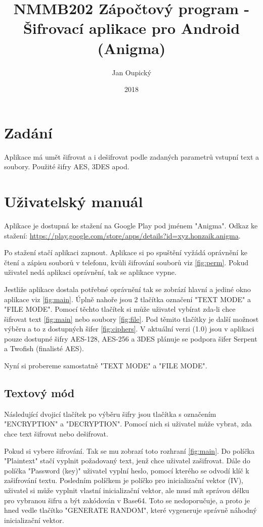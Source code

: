 \documentclass[12pt, a4paper]{article}
\title{NMMB202 Zápočtový program - Šifrovací aplikace pro Android (Anigma)}
\author{Jan Oupický}
\date{2018}
\begin{document}
\maketitle

\section{Zadání}

Aplikace má umět šifrovat a i dešifrovat podle zadaných parametrů vstupní text a soubory. Použité šifry AES, 3DES apod.

\section{Uživatelský manuál}

Aplikace je dostupná ke stažení na Google Play pod jménem "Anigma". Odkaz ke stažení: \url{https://play.google.com/store/apps/details?id=xyz.honzaik.anigma}.

Po stažení stačí aplikaci zapnout. Aplikace si po spuštění vyžádá oprávnění ke čtení a zápisu souborů v telefonu, kvůli šifrování souborů viz \ref{fig:perm}. Pokud uživatel nedá aplikaci oprávnění, tak se aplikace vypne.

Jestliže aplikace dostala potřebné oprávnění tak se zobrází hlavní a jediné okno aplikace viz \ref{fig:main}. Úplně nahoře jsou 2 tlačítka označení "TEXT MODE" a "FILE MODE". Pomocí těchto tlačítek si může uživatel vybírat zda-li chce šifrovat text \ref{fig:main} nebo soubory \ref{fig:file}. Pod těmito tlačítky je další možnost výběru a to z dostupných šifer \ref{fig:ciphers}. V aktuální verzi (1.0) jsou v aplikaci pouze dostupné šifry AES-128, AES-256 a 3DES plánuje se podpora šifer Serpent a Twofish (finalisté AES).

Nyní si probereme samostatně "TEXT MODE" a "FILE MODE".

\subsection{Textový mód}
Následující dvojicí tlačítek po výběru šifry jsou tlačítka s označením "ENCRYPTION" a "DECRYPTION". Pomocí nich si uživatel může vybrat, zda chce text šifrovat nebo dešifrovat. 

Pokud si vybere šifrování. Tak se mu zobrazí toto rozhraní \ref{fig:main}. Do políčka "Plaintext" stačí vyplnit požadovaný text, jenž chce uživatel zašifrovat. Dále do políčka "Password (key)" uživatel vyplní heslo, pomocí kterého se odvodí klíč k zašifrování textu. Posledním políčkem je políčko pro inicializační vektor (IV), uživatel si může vyplnit vlastní inicializační vektor, ale musí mít správou délku pro vybranou šifru a být zakódován v Base64. Toto se nedoporučuje, a proto je hned vedle tlačítko "GENERATE RANDOM", které vygeneruje správně náhodný inicializační vektor.
\end{document}
